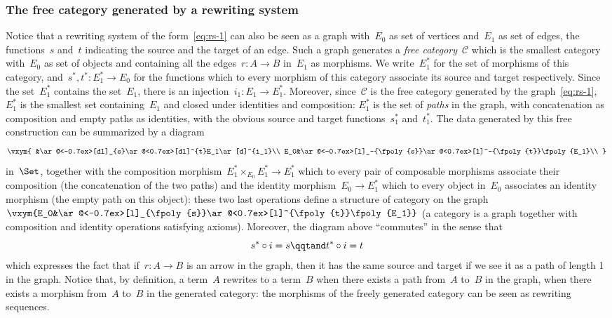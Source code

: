 \documentclass{LMCS}
\renewcommand{\C}{\mathcal{C}}
\begin{document}
\subsubsection{The free category generated by a rewriting system}
\label{sec:rs-1-fcat}
Notice that a rewriting system of the form~\eqref{eq:rs-1} can also be seen as a
graph with~$E_0$ as set of vertices and~$E_1$ as set of edges, the functions~$s$
and~$t$ indicating the source and the target of an edge. Such a graph generates
a \emph{free category}~$\C$ which is the smallest category with~$E_0$ as set of
objects and containing all the edges~$r:A\to B$ in~$E_1$ as morphisms. We
write~$E_1^*$ for the set of morphisms of this category, and~$s^*,t^*:E_1^*\to
E_0$ for the functions which to every morphism of this category associate its
source and target respectively. Since the set~$E_1^*$ contains the set~$E_1$,
there is an injection~$i_1:E_1\to E_1^*$. Moreover, since~$\C$ is the free
category generated by the graph~\eqref{eq:rs-1}, $E_1^*$ is the smallest set
containing~$E_1$ and closed under identities and composition: $E_1^*$ is the set
of \emph{paths} in the graph, with concatenation as composition and empty paths
as identities, with the obvious source and target functions~$s_1^*$
and~$t_1^*$. The data generated by this free construction can be summarized by a
diagram
\[
\vxym{
  &\ar@<-0.7ex>[dl]_{s}\ar@<0.7ex>[dl]^{t}E_1\ar[d]^{i_1}\\
  E_0&\ar@<-0.7ex>[l]_-{\fpoly{s}}\ar@<0.7ex>[l]^-{\fpoly{t}}\fpoly{E_1}\\
}
\]
in~$\Set$, together with the composition morphism~$E_1^*\times_{E_0}E_1^*\to
E_1^*$ which to every pair of composable morphisms associate their composition
(\ie the concatenation of the two paths) and the identity morphism~$E_0\to
E_1^*$ which to every object in~$E_0$ associates an identity morphism (\ie the
empty path on this object): these two last operations define a structure of
category on the
graph~$\vxym{E_0&\ar@<-0.7ex>[l]_{\fpoly{s}}\ar@<0.7ex>[l]^{\fpoly{t}}\fpoly{E_1}}$
(a category is a graph together with composition and identity operations
satisfying axioms).
Moreover, the diagram above ``commutes'' in the sense that
\[
s^*\circ i=s
\qqtand
t^*\circ i=t
\]
which expresses the fact that if~$r:A\to B$ is an arrow in the graph, then it
has the same source and target if we see it as a path of length 1 in the
graph. Notice that, by definition, a term~$A$ rewrites to a term~$B$ when there
exists a path from~$A$ to~$B$ in the graph, \ie when there exists a morphism
from~$A$ to~$B$ in the generated category: the morphisms of the freely generated
category can be seen as rewriting sequences.
\end{document}
